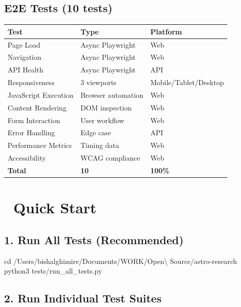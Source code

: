 \documentclass[
  11pt,
  oneside,
  openany]{scrbook}
\newenvironment{Shaded}{\begin{snugshade}}{\end{snugshade}}
\newcommand{\BuiltInTok}[1]{\textcolor[rgb]{0.00,0.23,0.31}{#1}}
\newcommand{\ExtensionTok}[1]{\textcolor[rgb]{0.00,0.23,0.31}{#1}}
\newcommand{\NormalTok}[1]{\textcolor[rgb]{0.00,0.23,0.31}{#1}}
\begin{document}
\subsection{E2E Tests (10 tests)}\label{e2e-tests-10-tests}

\begin{longtable}[]{@{}lll@{}}
\toprule\noalign{}
Test & Type & Platform \\
\midrule\noalign{}
\endhead
\bottomrule\noalign{}
\endlastfoot
Page Load & Async Playwright & Web \\
Navigation & Async Playwright & Web \\
API Health & Async Playwright & API \\
Responsiveness & 3 viewports & Mobile/Tablet/Desktop \\
JavaScript Execution & Browser automation & Web \\
Content Rendering & DOM inspection & Web \\
Form Interaction & User workflow & Web \\
Error Handling & Edge case & API \\
Performance Metrics & Timing data & Web \\
Accessibility & WCAG compliance & Web \\
\textbf{Total} & \textbf{10} & \textbf{100\%} \\
\end{longtable}

\section{🚀 Quick Start}\label{quick-start}

\subsection{1. Run All Tests
(Recommended)}\label{run-all-tests-recommended}

\begin{Shaded}
\begin{Highlighting}[]
\BuiltInTok{cd}\NormalTok{ /Users/bishalghimire/Documents/WORK/Open\textbackslash{} Source/astro{-}research}
\ExtensionTok{python3}\NormalTok{ tests/run\_all\_tests.py}
\end{Highlighting}
\end{Shaded}

\subsection{2. Run Individual Test
Suites}\label{run-individual-test-suites}
\end{document}
